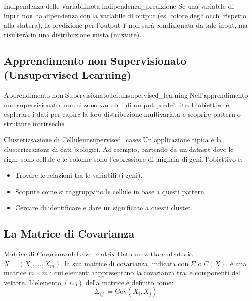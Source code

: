 \begin{nota}{Indipendenza delle Variabili}{nota:indipendenza_predizione}
Se una variabile di input non ha dipendenza con la variabile di output (es. colore degli occhi rispetto alla statura), la predizione per l'output \(Y\) non sarà condizionata da tale input, ma risulterà in una distribuzione mista (mixture).
\end{nota}


\subsection{Apprendimento non Supervisionato (Unsupervised Learning)}

\begin{definizione}{Apprendimento non Supervisionato}{def:unsupervised_learning}
Nell'apprendimento non supervisionato, non ci sono variabili di output predefinite. L'obiettivo è esplorare i dati per capire la loro distribuzione multivariata e scoprire pattern o strutture intrinseche.
\end{definizione}

\begin{esempio}{Clusterizzazione di Cellule}{unsupervised_cases}
Un'applicazione tipica è la clusterizzazione di dati biologici. Ad esempio, partendo da un dataset dove le righe sono cellule e le colonne sono l'espressione di migliaia di geni, l'obiettivo è:
\begin{itemize}
    \item Trovare le relazioni tra le variabili (i geni).
    \item Scoprire come si raggruppano le cellule in base a questi pattern.
    \item Cercare di identificare e dare un significato a questi cluster.
\end{itemize}
\end{esempio}

\subsection{La Matrice di Covarianza}

\begin{definizione}{Matrice di Covarianza}{def:cov_matrix}
Dato un vettore aleatorio \(X = (X_1, \dots, X_m)\), la sua matrice di covarianza, indicata con \(\Sigma\) o \(C(X)\), è una matrice \(m \times m\) i cui elementi rappresentano la covarianza tra le componenti del vettore.
L'elemento \((i, j)\) della matrice è definito come:
\[
\Sigma_{ij} := \text{Cov}(X_i, X_j)
\]

\end{definizione}

